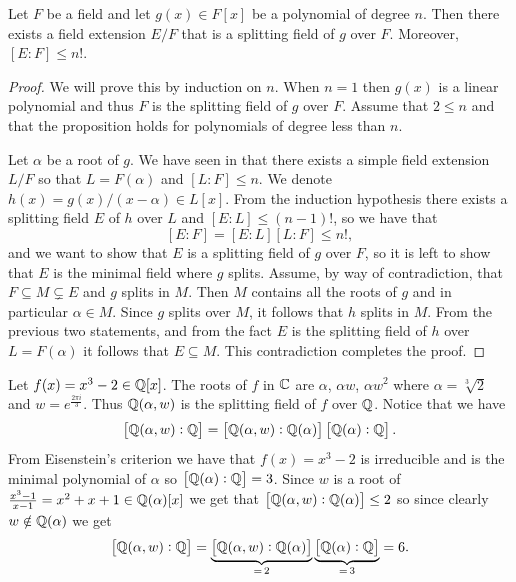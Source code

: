 \documentclass[11pt,a4paper]{article}
\begin{document}
\begin{proposition}
  Let $F$ be a field and let $g(x) \in F[x]$ be a polynomial of degree $n$.
  Then there exists a field extension $E/F$ that is a splitting field
  of $g$ over $F$.
  Moreover, $[E : F] \le n!$.
\end{proposition}
\begin{proof}
  We will prove this by induction on $n$.
  When $n = 1$ then $g(x)$ is a linear polynomial and thus $F$
  is the splitting field of $g$ over $F$.
  Assume that $2 \le n$ and that the proposition holds for polynomials
  of degree less than $n$.

  Let $\alpha$ be a root of $g$.
  We have seen in 
  that there exists a simple field extension $L/F$ so that
  $L = F(\alpha)$ and $[L : F] \le n$.
  We denote $h(x) = g(x) / (x - \alpha) \in L[x]$.
  From the induction hypothesis there exists a splitting field $E$ of $h$
  over $L$ and $[E : L] \le (n-1)!$,
  so we have that
  \[
    [E : F] = [E : L] [L : F] \le n!,
  \]
  and we want to show that $E$ is a splitting field of $g$ over $F$,
  so it is left to show that $E$ is the minimal field where $g$ splits.
  Assume, by way of contradiction,
  that $F \subseteq M \subsetneq E$ and $g$ splits in $M$.
  Then $M$ contains all the roots of $g$ and in particular $\alpha \in M$.
  Since $g$ splits over $M$, it follows that $h$ splits in $M$.
  From the previous two statements, and from the fact $E$ is the splitting
  field of $h$ over $L = F(\alpha)$ it follows that $E \subseteq M$.
  This contradiction completes the proof.
\end{proof}

\begin{example}
  \label{exmp:x-three-two}
  Let $f(x) = x^3 - 2 \in \mathbb{Q}[x]$.
  The roots of $f$ in $\mathbb{C}$ are $\alpha$, $\alpha w$, $\alpha w^2$
  where $\alpha = \sqrt[3]{2}$ and $w = e^{\frac{2 \pi i}{3}}$.
  Thus $\mathbb{Q}(\alpha,w)$ is the splitting field of $f$ over $\mathbb{Q}$.
  Notice that we have
  \[
    \left[\mathbb{Q}(\alpha,w) : \mathbb{Q}\right] =
    \left[\mathbb{Q}(\alpha,w) : \mathbb{Q}(\alpha)\right]
    \left[\mathbb{Q}(\alpha) : \mathbb{Q}\right].
  \]
  From Eisenstein's criterion we have that $f(x) = x^3 - 2$ is irreducible
  and is the minimal polynomial of $\alpha$ so
  $\left[\mathbb{Q}(\alpha) : \mathbb{Q}\right] = 3$.
  Since $w$ is a root of
  $\frac{x^3 - 1}{x - 1} = x^2 + x + 1 \in \mathbb{Q}(\alpha)[x]$
  we get that $\left[\mathbb{Q}(\alpha,w) : \mathbb{Q}(\alpha)\right] \le 2$
  so since clearly $w \notin \mathbb{Q}(\alpha)$ we get
  \[
    \left[\mathbb{Q}(\alpha,w) : \mathbb{Q}\right] =
    \underbrace{\left[\mathbb{Q}(\alpha,w) : \mathbb{Q}(\alpha)\right]}_{=\,2}
    \underbrace{\left[\mathbb{Q}(\alpha) : \mathbb{Q}\right]}_{=\,3} = 6.
  \]
\end{example}
\end{document}
